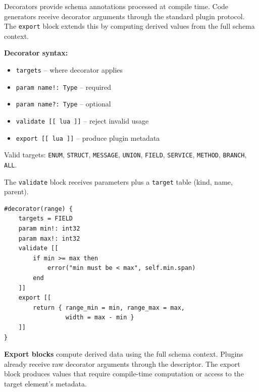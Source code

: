 \documentclass[11pt,onecolumn]{article}
\begin{document}
\begin{minipage}{\textwidth}
Decorators provide schema annotations processed at compile time. Code generators receive decorator arguments through the standard plugin protocol. The \texttt{export} block extends this by computing derived values from the full schema context.

\vspace{4pt}
\begin{minipage}[t]{0.44\textwidth}
\small
\textbf{Decorator syntax:}
\begin{itemize}[leftmargin=1.2em,itemsep=0pt,topsep=2pt]
\item \texttt{targets} -- where decorator applies
\item \texttt{param name!: Type} -- required
\item \texttt{param name?: Type} -- optional
\item \texttt{validate [[ lua ]]} -- reject invalid usage
\item \texttt{export [[ lua ]]} -- produce plugin metadata
\end{itemize}

\vspace{2pt}
{\footnotesize Valid targets: \texttt{ENUM}, \texttt{STRUCT}, \texttt{MESSAGE}, \texttt{UNION}, \texttt{FIELD}, \texttt{SERVICE}, \texttt{METHOD}, \texttt{BRANCH}, \texttt{ALL}.}

\vspace{4pt}
The \texttt{validate} block receives parameters plus a \texttt{target} table (kind, name, parent).
\end{minipage}\hfill
\begin{minipage}[t]{0.52\textwidth}
\begin{lstlisting}[language=bebop,aboveskip=0pt,belowskip=0pt,basicstyle=\ttfamily\footnotesize]
#decorator(range) {
    targets = FIELD
    param min!: int32
    param max!: int32
    validate [[
        if min >= max then
            error("min must be < max", self.min.span)
        end
    ]]
    export [[
        return { range_min = min, range_max = max,
                 width = max - min }
    ]]
}
\end{lstlisting}
\end{minipage}

\vspace{6pt}
\textbf{Export blocks} compute derived data using the full schema context. Plugins already receive raw decorator arguments through the descriptor. The export block produces values that require compile-time computation or access to the target element's metadata.


\end{minipage}
\end{document}
